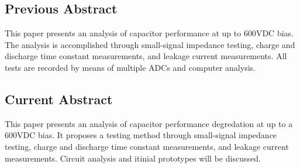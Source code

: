 \subsection{Previous Abstract}
This paper presents an analysis of capacitor performance at up to 600VDC bias. The analysis is accomplished through small-signal impedance testing, charge and discharge time constant measurements, and leakage current measurements. All tests are recorded by means of multiple ADCs and computer analysis.

\subsection{Current Abstract}
\label{sec:abstract}
This paper presents an analysis of capacitor performance degredation at up to a 600VDC bias. It proposes a testing method through small-signal impedance testing, charge and discharge time constant measurements, and leakage current measurements. Circuit analysis and itinial prototypes will be discussed.

